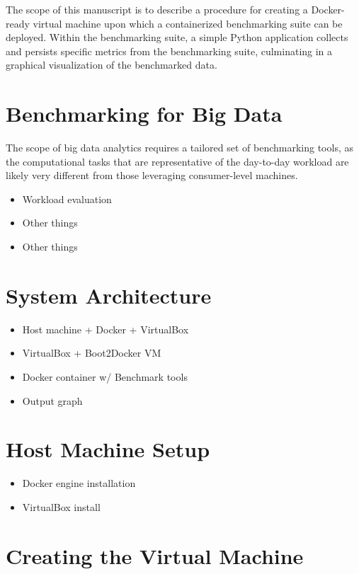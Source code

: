 \documentclass[sigconf]{acmart}
\begin{document}
The scope of this manuscript is to describe a procedure for creating a Docker-ready virtual machine upon which a containerized benchmarking suite can be deployed. Within the benchmarking suite, a simple Python application collects and persists specific metrics from the benchmarking suite, culminating in a graphical visualization of the benchmarked data. 

\section{Benchmarking for Big Data}

The scope of big data analytics requires a tailored set of benchmarking tools, as the computational tasks that are representative of the day-to-day workload are likely very different from those leveraging consumer-level machines.

\begin{itemize}
  \item Workload evaluation
  \item Other things
  \item Other things
\end{itemize}

\section{System Architecture}

\begin{itemize}
  \item Host machine + Docker + VirtualBox
  \item VirtualBox + Boot2Docker VM
  \item Docker container w/ Benchmark tools
  \item Output graph
\end{itemize}

\section{Host Machine Setup}

\begin{itemize}
  \item Docker engine installation
  \item VirtualBox install
\end{itemize}

\section{Creating the Virtual Machine}
\end{document}
